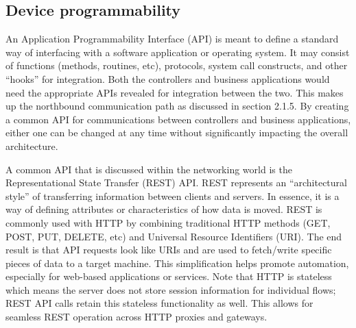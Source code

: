 \subsection{Device programmability}
An Application Programmability Interface (API) is meant to define a standard
way of interfacing with a software application or operating system. It may
consist of functions (methods, routines, etc), protocols, system call
constructs, and other ``hooks'' for integration. Both the controllers and
business applications would need the appropriate APIs revealed for integration
between the two. This makes up the northbound communication path as discussed
in section 2.1.5. By creating a common API for communications between
controllers and business applications, either one can be changed at any time
without significantly impacting the overall architecture.

A common API that is discussed within the networking world is the
Representational State Transfer (REST) API. REST represents an ``architectural
style'' of transferring information between clients and servers. In essence, it
is a way of defining attributes or characteristics of how data is moved. REST
is commonly used with HTTP by combining traditional HTTP methods (GET, POST,
PUT, DELETE, etc) and Universal Resource Identifiers (URI). The end result is
that API requests look like URIs and are used to fetch/write specific pieces
of data to a target machine. This simplification helps promote automation,
especially for web-based applications or services. Note that HTTP is stateless
which means the server does not store session information for individual
flows; REST API calls retain this stateless functionality as well. This allows
for seamless REST operation across HTTP proxies and gateways.

